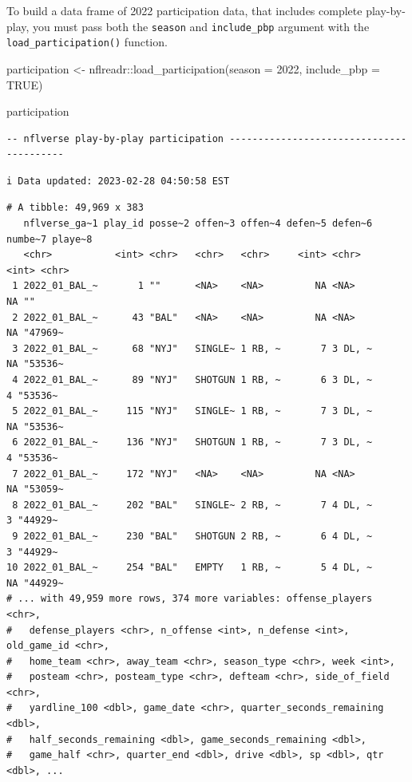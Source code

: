 \documentclass[
  letterpaper,
]{krantz}
\newenvironment{Shaded}{\begin{snugshade}}{\end{snugshade}}
\newcommand{\AttributeTok}[1]{\textcolor[rgb]{0.40,0.45,0.13}{#1}}
\newcommand{\ConstantTok}[1]{\textcolor[rgb]{0.56,0.35,0.01}{#1}}
\newcommand{\DecValTok}[1]{\textcolor[rgb]{0.68,0.00,0.00}{#1}}
\newcommand{\FunctionTok}[1]{\textcolor[rgb]{0.28,0.35,0.67}{#1}}
\newcommand{\NormalTok}[1]{\textcolor[rgb]{0.00,0.23,0.31}{#1}}
\newcommand{\OtherTok}[1]{\textcolor[rgb]{0.00,0.23,0.31}{#1}}
\newcommand{\SpecialCharTok}[1]{\textcolor[rgb]{0.37,0.37,0.37}{#1}}
\begin{document}
To build a data frame of 2022 participation data, that includes complete
play-by-play, you must pass both the \texttt{season} and
\texttt{include\_pbp} argument with the \texttt{load\_participation()}
function.

\begin{Shaded}
\begin{Highlighting}[]
\NormalTok{participation }\OtherTok{\textless{}{-}}
\NormalTok{  nflreadr}\SpecialCharTok{::}\FunctionTok{load\_participation}\NormalTok{(}\AttributeTok{season =} \DecValTok{2022}\NormalTok{, }\AttributeTok{include\_pbp =} \ConstantTok{TRUE}\NormalTok{)}

\NormalTok{participation}
\end{Highlighting}
\end{Shaded}

\begin{verbatim}
-- nflverse play-by-play participation -----------------------------------------
\end{verbatim}

\begin{verbatim}
i Data updated: 2023-02-28 04:50:58 EST
\end{verbatim}

\begin{verbatim}
# A tibble: 49,969 x 383
   nflverse_ga~1 play_id posse~2 offen~3 offen~4 defen~5 defen~6 numbe~7 playe~8
   <chr>           <int> <chr>   <chr>   <chr>     <int> <chr>     <int> <chr>  
 1 2022_01_BAL_~       1 ""      <NA>    <NA>         NA <NA>         NA ""     
 2 2022_01_BAL_~      43 "BAL"   <NA>    <NA>         NA <NA>         NA "47969~
 3 2022_01_BAL_~      68 "NYJ"   SINGLE~ 1 RB, ~       7 3 DL, ~      NA "53536~
 4 2022_01_BAL_~      89 "NYJ"   SHOTGUN 1 RB, ~       6 3 DL, ~       4 "53536~
 5 2022_01_BAL_~     115 "NYJ"   SINGLE~ 1 RB, ~       7 3 DL, ~      NA "53536~
 6 2022_01_BAL_~     136 "NYJ"   SHOTGUN 1 RB, ~       7 3 DL, ~       4 "53536~
 7 2022_01_BAL_~     172 "NYJ"   <NA>    <NA>         NA <NA>         NA "53059~
 8 2022_01_BAL_~     202 "BAL"   SINGLE~ 2 RB, ~       7 4 DL, ~       3 "44929~
 9 2022_01_BAL_~     230 "BAL"   SHOTGUN 2 RB, ~       6 4 DL, ~       3 "44929~
10 2022_01_BAL_~     254 "BAL"   EMPTY   1 RB, ~       5 4 DL, ~      NA "44929~
# ... with 49,959 more rows, 374 more variables: offense_players <chr>,
#   defense_players <chr>, n_offense <int>, n_defense <int>, old_game_id <chr>,
#   home_team <chr>, away_team <chr>, season_type <chr>, week <int>,
#   posteam <chr>, posteam_type <chr>, defteam <chr>, side_of_field <chr>,
#   yardline_100 <dbl>, game_date <chr>, quarter_seconds_remaining <dbl>,
#   half_seconds_remaining <dbl>, game_seconds_remaining <dbl>,
#   game_half <chr>, quarter_end <dbl>, drive <dbl>, sp <dbl>, qtr <dbl>, ...
\end{verbatim}
\end{document}
